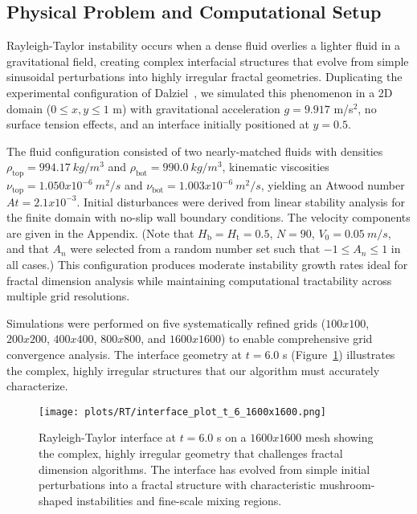 \documentclass[preprint,12pt]{elsarticle}
\def\times{x}%
\begin{document}
\subsection{Physical Problem and Computational Setup}
\label{subsec:rt_setup}

Rayleigh-Taylor instability occurs when a dense fluid overlies a lighter fluid in a gravitational field, creating complex interfacial structures that evolve from simple sinusoidal perturbations into highly irregular fractal geometries. Duplicating the experimental configuration of Dalziel~\cite{dalziel1993}, we simulated this phenomenon in a 2D domain ($0 \leq x,y \leq 1$ m) with gravitational acceleration $g = 9.917$ m/s$^2$, no surface tension effects, and an interface initially positioned at $y = 0.5$.

The fluid configuration consisted of two nearly-matched fluids with densities $\rho_{\text{top}} = 994.17 \  kg/m^3$ and $\rho_{\text{bot}} = 990.0 \  kg/m^3$, kinematic viscosities $\nu_{\text{top}} = 1.050 \times 10^{-6}\  m^2/s$ and $\nu_{\text{bot}} = 1.003 \times 10^{-6} \
 m^2/s$, yielding an Atwood number $At = 2.1 \times 10^{-3}$. Initial disturbances were derived from linear stability analysis for the finite domain with no-slip wall boundary conditions. The velocity components  are given in the Appendix. (Note that $H_{\text{b}} = H_{\text{t}} = 0.5$, $N = 90$, $V_0 = 0.05 \ m/s$,  and that  $A_n$ were selected from a random number set  such that $-1 \leq A_n \leq 1$ in all cases.)  This configuration produces moderate instability growth rates ideal for fractal dimension analysis while maintaining computational tractability across multiple grid resolutions.

Simulations were performed on five systematically refined grids ($100 \times 100$, $200 \times 200$, $400 \times 400$, $800 \times 800$, and $1600 \times 1600$) to enable comprehensive grid convergence analysis. The interface geometry at $t = 6.0$ s (Figure~\ref{fig:rt_interface_t6}) illustrates the complex, highly irregular structures that our algorithm must accurately characterize.

\begin{figure}[htb]
\centering
\texttt{[image: plots/RT/interface\_plot\_t\_6\_1600x1600.png]}
\caption{Rayleigh-Taylor interface at $t = 6.0$ s on a $1600 \times 1600$ mesh showing the complex, highly irregular geometry that challenges fractal dimension algorithms. The interface has evolved from simple initial perturbations into a fractal structure with characteristic mushroom-shaped instabilities and fine-scale mixing regions.}
\label{fig:rt_interface_t6}
\end{figure}
\end{document}
